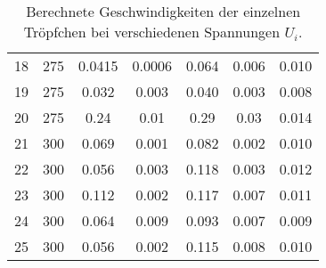 \begin{table}
\begin{tabular}{S[table-format=2.0] S[table-format=3.0] S[table-format=1.6] S[table-format=1.6] S[table-format=1.4] S[table-format=1.4]S[table-format=1.3]}
18  & 275   &   0.0415    & 0.0006     & 0.064     & 0.006     & 0.010   \\
19  & 275   &   0.032     & 0.003      & 0.040     & 0.003     & 0.008   \\
20  & 275   &   0.24      & 0.01       & 0.29      & 0.03      & 0.014   \\
21  & 300   &   0.069     & 0.001      & 0.082     & 0.002     & 0.010   \\
22  & 300   &   0.056     & 0.003      & 0.118     & 0.003     & 0.012   \\
23  & 300   &   0.112     & 0.002      & 0.117     & 0.007     & 0.011   \\
24  & 300   &   0.064     & 0.009      & 0.093     & 0.007     & 0.009   \\
25  & 300   &   0.056     & 0.002      & 0.115     & 0.008     & 0.010   \\
		\bottomrule
	\end{tabular}
	\caption{Berechnete Geschwindigkeiten der einzelnen Tröpfchen bei verschiedenen Spannungen $U_i$.} 
	\label{tab:werte}
\end{table}
